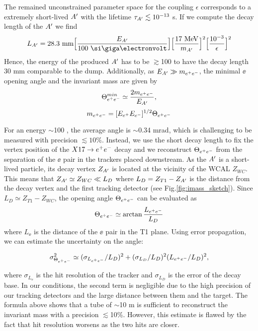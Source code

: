 The remained unconstrained parameter space for the coupling $\epsilon$  corresponds to a extremely short-lived $A'$ with the lifetime $\tau_{A'} \lesssim 10^{-13}$ s. If we compute the decay length of the $A'$ we find 
\begin{equation}
L_{\DM} = 28.3 ~{\rm mm}  \Bigl[\frac{E_{\DM}}{100~ \text{\gev}}\Bigr] \Bigl[\frac{17~ \text{MeV}}{m_{\DM}}\Bigr]^2 \Bigl[\frac{10^{-3}}{\epsilon}\Bigr]^2
\label{eqn:length}
\end{equation}
Hence, the energy of the produced $A'$ has to be $\gtrsim$100 \gev to have the decay length 30 mm comparable to the dump.
Additionally, as $E_{A'} \gg m_{e^+e^-}$, the minimal $\ee$ opening angle and the invariant mass are given by
\begin{equation} 
\Theta_{ e^+e^-}^{min} \simeq  \frac{2m_{e^+e^-}}{E_{A'}},
\label{eqn:angle}
\end{equation}
\begin{equation}
m_{e^+e^-} = [E_{e^+} E_{e^-}]^{1/2} \Theta_{ e^+e^-}
\label{eqn:imass}
\end{equation}

For an energy $\sim$100 \gev, the average angle is $\sim$0.34 mrad, which is challenging to be measured with precision $\lesssim 10\%$. Instead, we use the short decay length to fix the vertex position of the $X17 \rightarrow e^+ e^-$ decay and we reconstruct $\Theta_{ e^+e^-}$ from the separation of the $\ee$ pair in the trackers placed downstream. As the $A'$ is a short-lived particle, its decay vertex $Z_{A'}$ is located at the vicinity of the WCAL $Z_{WC}$. This means that $Z_{A'} \simeq Z_{WC} \ll L_D$ where $L_D=Z_{T1}-Z_{A'}$ is the distance from the decay vertex and the first tracking detector (see Fig.\ref{fig:imass_sketch}). Since $L_D \simeq Z_{T1} - Z_{WC}$, the opening angle $\Theta_{ e^+e^-}$ can be evaluated as 
\begin{equation}
\Theta_{ e^+e^-} \simeq \arctan{\frac{ L_{e^+e^-}}{L_D}}
\label{angle-est}
\end{equation}
where $L_{\ee}$ is the distance of the $\ee$ pair in the T1 plane. Using error propagation, we can estimate the uncertainty on the angle:

\begin{equation}
  \sigma^2_{\Theta_{ e^+e^-}} \simeq (\sigma_{L_{e^+e^-}}  / L_D)^2 + (\sigma_{L_D} / L_D)^2(L_{e^+e^-} / L_D)^2,
  \label{eqn:thetaerr}
\end{equation}

where $\sigma_{L_{\ee}}$ is the hit resolution of the tracker and $\sigma_{L_D}$ is the error of the decay base. In our conditions, the second term is negligible due to the high precision of our tracking detectors and the large distance between them and the target. The formula above shows that a tube of $\sim$10 m is sufficient to reconstruct the invariant mass with a precision $\lesssim$10\%. However, this estimate is flawed by the fact that hit resolution worsens as the two hits are closer.

